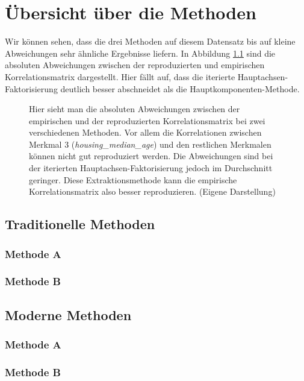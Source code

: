 \chapter{Übersicht über die Methoden}
\label{sec:Übersicht}

Wir können sehen, dass die drei Methoden auf diesem Datensatz bis auf kleine Abweichungen sehr ähnliche Ergebnisse liefern.
In Abbildung \ref{fig:Residualmatrizen} sind die absoluten Abweichungen zwischen der reproduzierten und empirischen Korrelationsmatrix dargestellt. Hier fällt auf, dass die iterierte Hauptachsen-Faktorisierung deutlich besser abschneidet als die Hauptkomponenten-Methode.
\begin{figure}[h]
	
	\caption[(Absolute) Residualmatrizen als Heatmap]{Hier sieht man die absoluten Abweichungen zwischen der empirischen und der reproduzierten Korrelationsmatrix bei zwei verschiedenen Methoden. Vor allem die Korrelationen zwischen Merkmal 3 (\textit{housing\_median\_age}) und
		den restlichen Merkmalen können nicht gut reproduziert werden. Die Abweichungen sind bei der iterierten Hauptachsen-Faktorisierung
		jedoch im Durchschnitt geringer. Diese Extraktionsmethode kann die empirische Korrelationsmatrix also besser reproduzieren.
		(Eigene Darstellung)}
	\label{fig:Residualmatrizen}
\end{figure}


\section{Traditionelle Methoden}

\subsection{Methode A}
\subsection{Methode B}

\section{Moderne Methoden}
\subsection{Methode A}
\subsection{Methode B}


